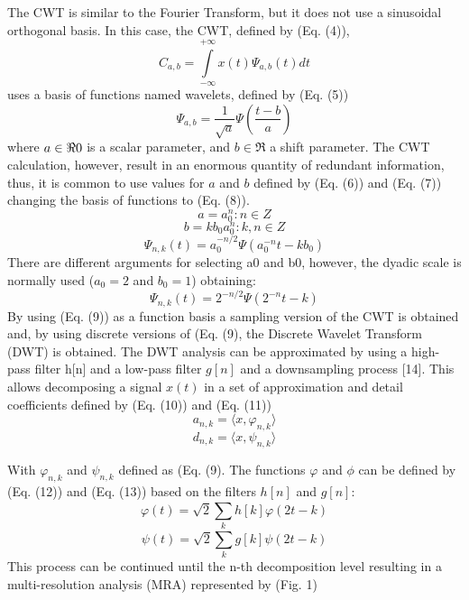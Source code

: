\documentclass[12pt, a4paper]{article}
\begin{document}
The CWT is similar to the Fourier Transform, but it does not use a sinusoidal orthogonal basis. In this case, the CWT, defined by (Eq. (4)), 
\begin{equation}
C_{a,b} = \int\limits_{-\infty}^{+\infty} x(t) \Psi_{a,b}(t) dt
\end{equation}
uses a basis of functions named wavelets, defined by (Eq. (5)) 
\begin{equation}
\Psi_{a,b} = \frac{1}{\sqrt{a}} \Psi(\frac{t-b}{a})
\end{equation}
where $ a \in \Re \\ {0} $ is a scalar parameter, and $ b \in \Re $ a shift parameter. The CWT calculation, however, result in an enormous quantity of redundant information, thus, it is common to use values for $a$ and $b$ defined by (Eq. (6)) and (Eq. (7)) changing the basis of functions to (Eq. (8)).
\begin{equation}
a = a_{0}^{n} : n \in Z
\end{equation}
\begin{equation}
b = k b_{0} a_{0}^{n} : k, n \in Z
\end{equation}
\begin{equation}
\Psi_{n, k}(t) = a_{0}^{-n/2} \Psi(a_{0}^{-n} t - k b_0)
\end{equation}
There are different arguments for selecting a0 and b0, however, the dyadic scale is normally used ($a_0=2$ and $b_0=1$) obtaining:
\begin{equation}
\Psi_{n, k}(t) = 2^{-n/2} \Psi(2^{-n}t-k)
\end{equation}
By using (Eq. (9)) as a function basis a sampling version of the CWT is obtained and, by using discrete versions of (Eq. (9), the Discrete Wavelet Transform (DWT) is obtained.  The DWT analysis can be approximated by using a high-pass filter h[n] and a low-pass filter $g[n]$ and a downsampling process [14]. This allows decomposing a signal $x(t)$ in a set of approximation and detail coefficients defined by (Eq. (10)) and (Eq. (11))
\begin{equation}
a_{n,k} = \langle x, \varphi_{n,k} \rangle
\end{equation}
\begin{equation}
d_{n,k} = \langle x, \psi_{n,k} \rangle
\end{equation}

With $ \varphi_{n,k} $ and $ \psi_{n,k} $ defined as (Eq. (9). The functions $\varphi$ and $\phi$ can be defined by (Eq. (12)) and (Eq. (13)) based on the filters $h[n]$ and $g[n]$:
\begin{equation}
\varphi(t) = \sqrt{2} \sum\limits_{k}^{} h[k] \varphi(2t-k)
\end{equation}
\begin{equation}
\psi(t) = \sqrt{2} \sum\limits_{k}^{} g[k] \psi(2t-k)
\end{equation}
This process can be continued until the n-th decomposition level resulting in a multi-resolution analysis (MRA) represented by (Fig. 1) 
\end{document}
